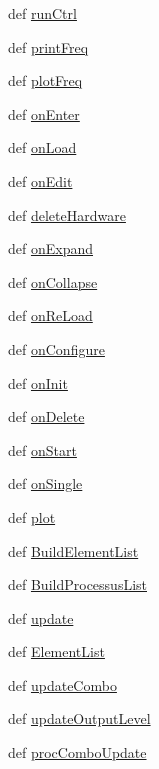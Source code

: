 \begin{DoxyCompactItemize}
\item 
def \hyperlink{classAppFrame_1_1AppFrame_a89e4b810a8f76474c63307ab353b95ae}{runCtrl}
\item 
def \hyperlink{classAppFrame_1_1AppFrame_a3319c92de38f17675b2debf064add617}{printFreq}
\item 
def \hyperlink{classAppFrame_1_1AppFrame_a724d4fb4f7b45e38c3002dafaf31ae3d}{plotFreq}
\item 
def \hyperlink{classAppFrame_1_1AppFrame_a40b3826412cf97464898e448b5eb9b00}{onEnter}
\item 
def \hyperlink{classAppFrame_1_1AppFrame_a6050b747faab481f9728a791ce5c8beb}{onLoad}
\item 
def \hyperlink{classAppFrame_1_1AppFrame_a17e104bbc8544539fcad9d3f75583438}{onEdit}
\item 
def \hyperlink{classAppFrame_1_1AppFrame_ae6dbfb701cee3d4f1ebd953d21934f90}{deleteHardware}
\item 
def \hyperlink{classAppFrame_1_1AppFrame_a66183c68b99e1849cb3a009aacf46578}{onExpand}
\item 
def \hyperlink{classAppFrame_1_1AppFrame_a7d96700ebc4f5a5fcf51d3d8940bcc54}{onCollapse}
\item 
def \hyperlink{classAppFrame_1_1AppFrame_a245f8c716ec863af51493af54f2cd7c6}{onReLoad}
\item 
def \hyperlink{classAppFrame_1_1AppFrame_a4d4525e84c9ababf7b5c80893c803fcc}{onConfigure}
\item 
def \hyperlink{classAppFrame_1_1AppFrame_a0f55c13ed518ba308a375dfc306fdee9}{onInit}
\item 
def \hyperlink{classAppFrame_1_1AppFrame_ad5e9ba93cb8013656d6500774cf60b53}{onDelete}
\item 
def \hyperlink{classAppFrame_1_1AppFrame_a49804b67199c453697ac5a4bcecc920e}{onStart}
\item 
def \hyperlink{classAppFrame_1_1AppFrame_af7be990776d498b34f698dc9451b4883}{onSingle}
\item 
def \hyperlink{classAppFrame_1_1AppFrame_a16fc60c79fde4dd7d9591ed3f21c3c01}{plot}
\item 
def \hyperlink{classAppFrame_1_1AppFrame_a44b82952390e069b184afd5986991ba4}{BuildElementList}
\item 
def \hyperlink{classAppFrame_1_1AppFrame_a7e349c4603f3f7ca0c5aa77a89d253dd}{BuildProcessusList}
\item 
def \hyperlink{classAppFrame_1_1AppFrame_aa01fc511db7b94a62d550a0087d750b9}{update}
\item 
def \hyperlink{classAppFrame_1_1AppFrame_a5281ab025cc34273c414c06e58f1507d}{ElementList}
\item 
def \hyperlink{classAppFrame_1_1AppFrame_a9dec5963f6ad7c33992ad7ec38567574}{updateCombo}
\item 
def \hyperlink{classAppFrame_1_1AppFrame_a6a35e9206bd5c1cedcfd8a9af7d6a8c6}{updateOutputLevel}
\item 
def \hyperlink{classAppFrame_1_1AppFrame_afeddbb4dfa87ced566b15d905eed4756}{procComboUpdate}
\end{DoxyCompactItemize}
